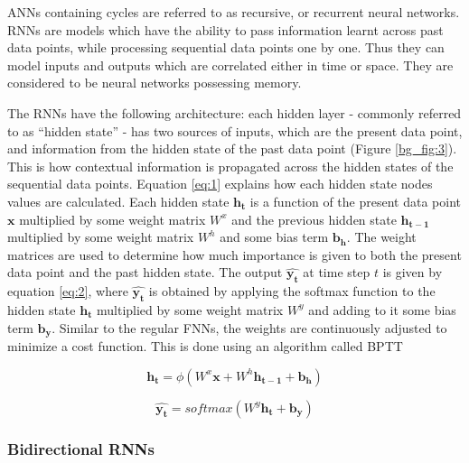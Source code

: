 
\ac{ANN}s containing cycles are referred to as recursive, or recurrent neural networks. \ac{RNN}s are models which have the ability to pass information learnt across past data points, while processing sequential data points one by one. Thus they can model inputs and outputs which are correlated either in time or space. They are considered to be neural networks possessing memory.


The \ac{RNN}s have the following architecture: each hidden layer - commonly referred to as \enquote{hidden state} - has two sources of inputs, which are the present data point, and information from the hidden state of the past data point (Figure \ref{bg_fig:3}). This is how contextual information is propagated across the hidden states of the sequential data points. 
Equation \ref{eq:1} explains how each hidden state nodes values are calculated. Each hidden state $ \mathbf{h_t} $ is a function of the present data point $ \mathbf{x} $ multiplied by some weight matrix $ W^x $ and the previous hidden state $ \mathbf{h_{t-1}} $ multiplied by some weight matrix $ W^h $ and some bias term $ \mathbf{b_h} $. The weight matrices are used to determine how much importance is given to both the present data point and the past hidden state. The output $ \mathbf{\widehat{y_t}} $ at time step $ t $ is given by equation \ref{eq:2}, where $ \mathbf{\widehat{y_t}} $ is obtained by applying the softmax function to the hidden state $  \mathbf{h_t} $ multiplied by some weight matrix $ W^y $ and adding to it some bias term $ \mathbf{b_y} $. Similar to the regular \ac{FNN}s, the weights are continuously adjusted to minimize a cost function. This is done using an algorithm called \ac{BPTT} \cite{werbos1990backpropagation}


\begin{equation}
\label{eq:1}
\mathbf{h_t} = \phi(W^x \mathbf{x} + W^h \mathbf{h_{t-1}} + \mathbf{b_h})
\end{equation}

\begin{equation}
\label{eq:2}
\mathbf{\widehat{y_t}} = softmax(W^y \mathbf{h_t} + \mathbf{b_y})
\end{equation}


\subsubsection{Bidirectional \ac{RNN}s}
\label{bg:s2_sub2_subsub1}

